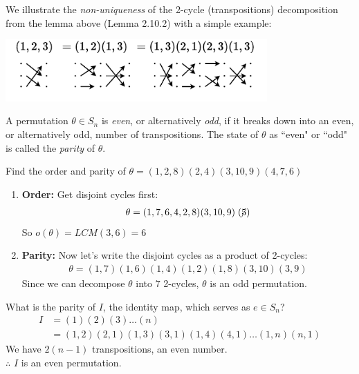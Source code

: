 \begin{example}
We illustrate the \textit{non-uniqueness} of the 2-cycle (transpositions) decomposition from the lemma above (Lemma 2.10.2) with a simple example:
\begin{center}
    \includegraphics[width=0.75\textwidth]{Figures/non_unique_cycle_trans.pdf}
\end{center}
\end{example}
\begin{definition}
A permutation $\theta \in S_n$ is \textit{even}, or alternatively \textit{odd}, if it breaks down into an even, or alternatively odd, number of transpositions. The state of $\theta$ as ``even" or ``odd" is called the \textit{parity} of $\theta$.
\end{definition}

\begin{example}
Find the order and parity of $\theta = (1,2,8)(2,4)(3,10,9)(4,7,6)$

\begin{enumerate}
    \item \textbf{Order:} Get disjoint cycles first:
    \begin{align}
        \theta = (1,7,6,4,2,8)(3,10,9)\centernot{(5)}\nonumber
    \end{align}
    So $o(\theta)=LCM(3,6)=6$
    \item \textbf{Parity:} Now let's write the disjoint cycles as a product of 2-cycles:
    \begin{align}
        \theta=(1,7)(1,6)(1,4)(1,2)(1,8)(3,10)(3,9) \nonumber
    \end{align}
    Since we can decompose $\theta$ into $7$ 2-cycles, $\theta$ is an odd permutation.
\end{enumerate}
\end{example}

\begin{example}
What is the parity of $I$, the identity map, which serves as $e\in S_n$?
\begin{align}
    I&=(1)(2)(3)\dots (n) \nonumber \\
    &= (1,2)(2,1)(1,3)(3,1)(1,4)(4,1)\dots (1,n)(n,1) \nonumber
\end{align}
We have $2(n-1)$ transpositions, an even number.\\
$\therefore$ $I$ is an even permutation.
\end{example}


